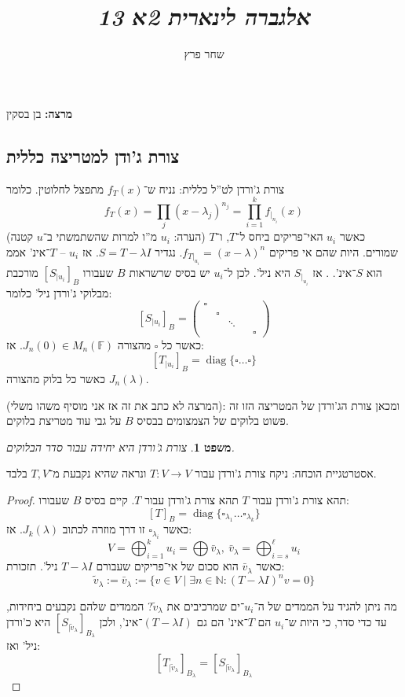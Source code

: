 \documentclass[]{article}
\author{שחר פרץ}
\title{\textit{אלגברה לינארית 2א 13}}
\newcommand\N     {\mathbb{N}}
\newcommand\ml    {\ell}
\DeclareMathOperator{\diag}    {diag}
\newcommand\F         {\mathbb{F}}
\newcommand\co        {\colon}
\newcommand\pms[1]    {\begin{pmatrix}
        #1
\end{pmatrix}}
\renewcommand\lg      {\lambda}
\newcommand\tl    {\tilde}
\newcommand\csb[1]    {\left [ #1 \right ]}
\newtheorem{Theorem}{משפט}
\theoremstyle{definition}
\newcommand\theo  [1] {\begin{Theorem}#1\end{Theorem}}
\begin{document}
    \maketitle
    \textbf{מרצה: }בן בסקין
    \subsection{צורת ג'ודן למטריצה כללית}
    
    צורת ג'ורדן לט''ל כללית: נניח ש־$f_T(x)$ מתפצל לחלוטין. כלומר
    \[ f_T(x) = \prod_{j}(x - \lg_j)^{n_j} = \prod_{i = 1}^{k}f_{|_{n_i}}(x) \]
    (הערה: $u_i$ מ''ו למרות שהשתמשתי ב־$u$ קטנה)
    כאשר $u_i$ האי־פריקים ביחס ל־$T$, ו־$T$ שמורים. היות שהם אי פריקים $f_{T|_{u_i}} = (x - \lg)^{n}$. נגדיר $S = T - \lg I$. אז $u_i$ – $T$־אינ' אממ הוא $S$־אינ'. 
    . אז $S_{|_{u_i}}$ היא ניל'. לכן ל־$u_i$ יש בסיס שרשראות $B$ שעבורו $[S_{|{u_i}}]_B$ מורכבת מבלוקי ג'ורדן ניל' כלומר: 
    \[ \csb{S_{|{u_i}}}_B = \pms{\square \\ & \square \\ && \ddots \\ &&&& \square} \]
    כאשר כל $\square$ מהצורה $J_n(0) \in M_n(\F)$. אז: 
    \[ \csb{T_{|{u_i}}}_B = \diag\{\square \dots \square\} \]
    כאשר כל בלוק מהצורה $J_n(\lg)$. 
    
    (המרצה לא כתב את זה אז אני מוסיף משהו משלי): ומכאן צורת הג'ורדן של המטריצה הזו זה פשוט בלוקים של הצמצומים בבסיס $B$ על גבי עוד מטריצת בלוקים. 
    
    \theo{צורת ג'ורדן היא יחידה עבור סדר הבלוקים. }אסטרטגיית הוכחה: ניקח צורת ג'ורדן עבור $T \co V \to V$ ונראה שהיא נקבעת מ־$T, V$ בלבד. 
    \begin{proof}
        תהא צורת ג'ורדן עבור $T$ תהא צורת ג'ורדן עבור $T$. קיים בסיס $B$ שעבורו: 
        \[ [T]_B = \diag\{\square_{\lg_1} \dots \square_{\lg_k}\} \]
        כאשר $\square_{\lg_i}$ זו דרך מוזרה לכתוב $J_k(\lg)$. 
        אז: 
        \[ V = \bigoplus_{i = 1}^{k} u_i = \bigoplus \bar v_{\lg}, \ \bar v_{\lg} = \bigoplus_{i = s}^{\ml} u_i \]
        כאשר $\bar v_{\lg}$ הוא סכום של אי־פריקים שעבורם $T - \lg I$ ניל'. תזכורת: 
        \[ \tl v_{\lg} := \bar v_{\lg} := \{v \in V \mid \exists n \in \N \co (T - \lg I)^nv = 0\} \]
        
        מה ניתן להגיד על הממדים של ה־$u_i$־ים שמרכיבים את $\tl v_\lg$? הממדים שלהם נקבעים ביחידות, עד כדי סדר, כי היות ש־$u_i$ הם $T$־אינ' הם גם $(T - \lg I)$־אינ', ולכן $[S_{|\tl v_\lg}]_{B_\lg}$ היא כ'ורדן ניל' ואז: 
        \[ \csb{T_{|\tl v_\lg}}_{B_\lg} = \csb{S_{|\tl v_\lg}}_{B_\lg} \]
    \end{proof}
    
\end{document}
